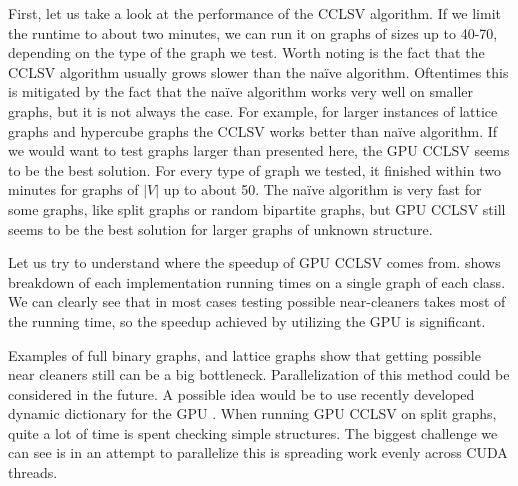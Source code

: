 First, let us take a look at the performance of the CCLSV algorithm. If we limit the runtime to about two minutes, we can run it on graphs of sizes up to 40-70, depending on the type of the graph we test. Worth noting is the fact that the CCLSV algorithm usually grows slower than the na\"ive algorithm. Oftentimes this is mitigated by the fact that the na\"ive algorithm works very well on smaller graphs, but it is not always the case. For example, for larger instances of lattice graphs and hypercube graphs the CCLSV works better than na\"ive algorithm. If we would want to test graphs larger than presented here, the GPU CCLSV seems to be the best solution. For every type of graph we tested, it finished within two minutes for graphs of $|V|$ up to about 50. The na\"ive algorithm is very fast for some graphs, like split graphs or random bipartite graphs, but GPU CCLSV still seems to be the best solution for larger graphs of unknown structure.

Let us try to understand where the speedup of GPU CCLSV comes from.  shows breakdown of each implementation running times on a single graph of each class. We can clearly see that in most cases testing possible near-cleaners takes most of the running time, so the speedup achieved by utilizing the GPU is significant. 

Examples of full binary graphs, and lattice graphs show that getting possible near cleaners still can be a big bottleneck. Parallelization of this method could be considered in the future. A possible idea would be to use recently developed dynamic dictionary for the GPU \cite{Ashkiani2018}. When running GPU CCLSV on split graphs, quite a lot of time is spent checking simple structures. The biggest challenge we can see is in an attempt to parallelize this is spreading work evenly across CUDA threads.



